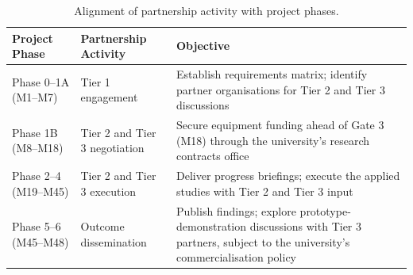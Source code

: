 \documentclass[12pt]{article}
\begin{document}
\begin{table}[h!]
\centering
\small
\setlength{\tabcolsep}{4pt}
\begin{tabularx}{\textwidth}{|>{\raggedright\arraybackslash}p{3.6cm}|>{\raggedright\arraybackslash}p{3.2cm}|>{\raggedright\arraybackslash}X|}
\hline
\textbf{Project Phase} & \textbf{Partnership Activity} & \textbf{Objective} \\
\hline
Phase 0--1A (M1--M7) &
Tier 1 engagement &
Establish requirements matrix; identify partner organisations for
Tier 2 and Tier 3 discussions \\
\hline
Phase 1B (M8--M18) &
Tier 2 and Tier 3 negotiation &
Secure equipment funding ahead of Gate 3 (M18) through the
university's research contracts office \\
\hline
Phase 2--4 (M19--M45) &
Tier 2 and Tier 3 execution &
Deliver progress briefings; execute the applied studies with Tier 2
and Tier 3 input \\
\hline
Phase 5--6 (M45--M48) &
Outcome dissemination &
Publish findings; explore prototype-demonstration discussions with
Tier 3 partners, subject to the university's commercialisation
policy \\
\hline
\end{tabularx}
\caption{Alignment of partnership activity with project phases.}
\label{tab:funding-timeline}
\end{table}
\end{document}
